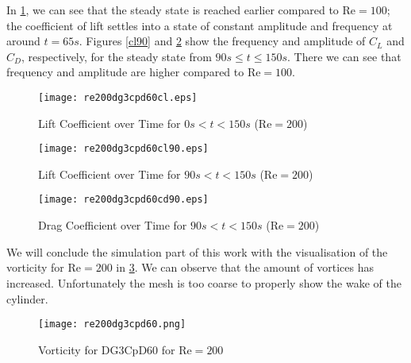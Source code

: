 In \cref{osci200}, we can see that the steady state is reached earlier compared to $\text{Re}=100$; the coefficient of lift settles into a state of constant amplitude and frequency at around $t=65s$. Figures \ref{cl90} and \ref{cdosci200} show the frequency and amplitude of $C_L$ and $C_D$, respectively, for the steady state from $90s \leq t \leq 150s$. There we can see that frequency and amplitude are higher compared to $\text{Re}=100$.
\begin{figure}[htp]	
	\centering
	\texttt{[image: re200dg3cpd60cl.eps]}
	\caption{Lift Coefficient over Time for $0s<t<150s$ ($\text{Re}=200$)}
	\label{osci200}	
\end{figure}
\begin{figure}[htp]	
	\begin{minipage}[b]{0.45\textwidth}
		\centering
		\texttt{[image: re200dg3cpd60cl90.eps]}
		\caption{Lift Coefficient over Time for $90s<t<150s$ ($\text{Re}=200$)}
		\label{cl90}
	\end{minipage}
	\quad
	\begin{minipage}[b]{0.45\textwidth}
		\centering
		\texttt{[image: re200dg3cpd60cd90.eps]}
		\caption{Drag Coefficient over Time for $90s<t<150s$ ($\text{Re}=200$)}
		\label{cdosci200}	
	\end{minipage}
\end{figure}
\newpage
We will conclude the simulation part of this work with the visualisation of the vorticity for $\text{Re}=200$ in \cref{fig:vorticity200}. We can observe that the amount of vortices has increased. Unfortunately the mesh is too coarse to properly show the wake of the cylinder.
\begin{figure}[htp]
	\centering
	\texttt{[image: re200dg3cpd60.png]}
	\caption{Vorticity for DG3CpD60 for $\text{Re} = 200$}
	\label{fig:vorticity200}
\end{figure}


